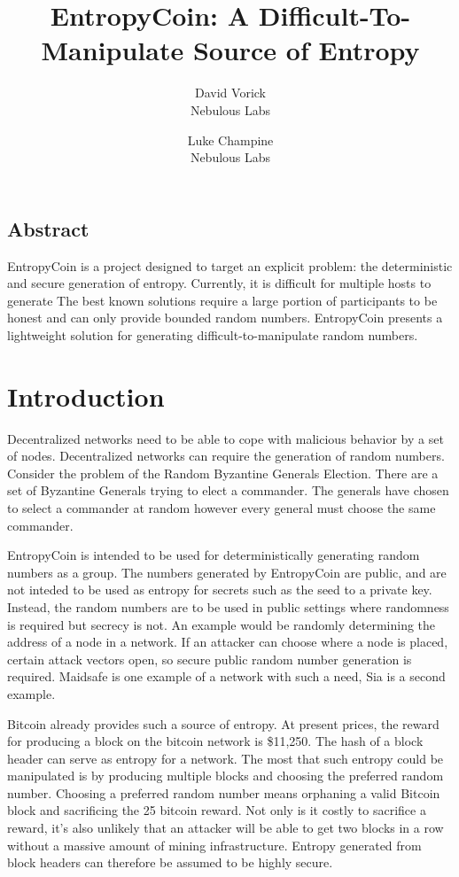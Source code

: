 \documentclass[twocolumn]{article}
\begin{document}
\frenchspacing

\title{EntropyCoin: A Difficult-To-Manipulate Source of Entropy}

\author{
{\rm David Vorick}\\
Nebulous Labs
}
\author{
{\rm Luke Champine}\\
Nebulous Labs
}

\maketitle

\subsection*{Abstract}
EntropyCoin is a project designed to target an explicit problem: the deterministic and secure generation of entropy.
Currently, it is difficult for multiple hosts to generate 
The best known solutions require a large portion of participants to be honest and can only provide bounded random numbers.
EntropyCoin presents a lightweight solution for generating difficult-to-manipulate random numbers.

\section{Introduction}
Decentralized networks need to be able to cope with malicious behavior by a set of nodes.
Decentralized networks can require the generation of random numbers.
Consider the problem of the Random Byzantine Generals Election.
There are a set of Byzantine Generals trying to elect a commander.
The generals have chosen to select a commander at random however every general must choose the same commander.

EntropyCoin is intended to be used for deterministically generating random numbers as a group.
The numbers generated by EntropyCoin are public, and are not inteded to be used as entropy for secrets such as the seed to a private key.
Instead, the random numbers are to be used in public settings where randomness is required but secrecy is not.
An example would be randomly determining the address of a node in a network.
If an attacker can choose where a node is placed, certain attack vectors open, so secure public random number generation is required.
Maidsafe is one example of a network with such a need, Sia is a second example.

Bitcoin already provides such a source of entropy.
At present prices, the reward for producing a block on the bitcoin network is \$11,250.
The hash of a block header can serve as entropy for a network.
The most that such entropy could be manipulated is by producing multiple blocks and choosing the preferred random number.
Choosing a preferred random number means orphaning a valid Bitcoin block and sacrificing the 25 bitcoin reward.
Not only is it costly to sacrifice a reward, it's also unlikely that an attacker will be able to get two blocks in a row without a massive amount of mining infrastructure.
Entropy generated from block headers can therefore be assumed to be highly secure.
\end{document}
